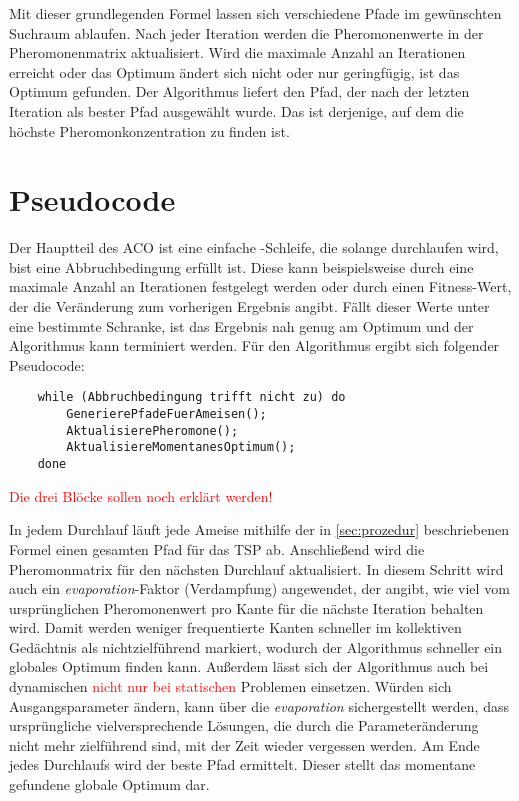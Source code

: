 Mit dieser grundlegenden Formel lassen sich verschiedene Pfade im
gewünschten Suchraum ablaufen.
Nach jeder Iteration werden die Pheromonenwerte in der Pheromonenmatrix
aktualisiert. Wird die maximale Anzahl an Iterationen erreicht oder das
Optimum ändert sich nicht oder nur geringfügig, ist das Optimum gefunden.
Der Algorithmus liefert den Pfad, der nach der letzten Iteration als
bester Pfad ausgewählt wurde. Das ist derjenige, auf dem die höchste
Pheromonkonzentration zu finden ist.

\section{Pseudocode}

Der Hauptteil des ACO ist eine einfache -Schleife, die solange
durchlaufen wird, bist eine Abbruchbedingung erfüllt ist. Diese kann
beispielsweise durch eine maximale Anzahl an Iterationen festgelegt werden
oder durch einen Fitness-Wert, der die Veränderung zum vorherigen Ergebnis
angibt. Fällt dieser Werte unter eine bestimmte Schranke, ist das Ergebnis
nah genug am Optimum und der Algorithmus kann terminiert werden.
Für den Algorithmus ergibt sich folgender Pseudocode:

\begin{lstlisting}
    while (Abbruchbedingung trifft nicht zu) do
        GenerierePfadeFuerAmeisen();
        AktualisierePheromone();
        AktualisiereMomentanesOptimum();
    done
\end{lstlisting}

\textcolor{red}{Die drei Blöcke sollen noch erklärt werden!}

In jedem Durchlauf läuft jede Ameise mithilfe der in \ref{sec:prozedur}
beschriebenen Formel einen gesamten Pfad für das TSP ab. Anschließend
wird die Pheromonmatrix für den nächsten Durchlauf aktualisiert.
In diesem Schritt wird auch ein \emph{evaporation}-Faktor (Verdampfung)
angewendet, der angibt, wie viel vom ursprünglichen Pheromonenwert pro
Kante für die nächste Iteration behalten wird. Damit werden weniger
frequentierte Kanten schneller im kollektiven Gedächtnis als
nichtzielführend markiert, wodurch der Algorithmus schneller ein globales
Optimum finden kann.
Außerdem lässt sich der Algorithmus auch bei dynamischen \textcolor{red}{
nicht nur bei statischen} Problemen einsetzen.
Würden sich Ausgangsparameter ändern, kann über die \emph{evaporation}
sichergestellt werden, dass ursprüngliche vielversprechende Lösungen, die
durch die Parameteränderung nicht mehr zielführend sind, mit der Zeit wieder
vergessen werden.
Am Ende jedes Durchlaufs wird der beste Pfad ermittelt. Dieser stellt das
momentane gefundene globale Optimum dar.

